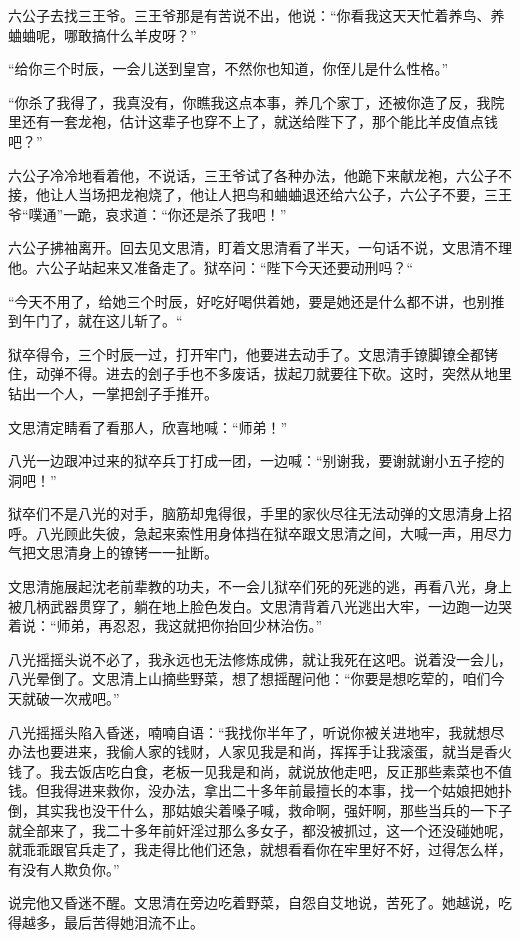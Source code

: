 六公子去找三王爷。三王爷那是有苦说不出，他说：“你看我这天天忙着养鸟、养蛐蛐呢，哪敢搞什么羊皮呀？”

“给你三个时辰，一会儿送到皇宫，不然你也知道，你侄儿是什么性格。”

“你杀了我得了，我真没有，你瞧我这点本事，养几个家丁，还被你造了反，我院里还有一套龙袍，估计这辈子也穿不上了，就送给陛下了，那个能比羊皮值点钱吧？”

六公子冷冷地看着他，不说话，三王爷试了各种办法，他跪下来献龙袍，六公子不接，他让人当场把龙袍烧了，他让人把鸟和蛐蛐退还给六公子，六公子不要，三王爷“噗通”一跪，哀求道：“你还是杀了我吧！”

六公子拂袖离开。回去见文思清，盯着文思清看了半天，一句话不说，文思清不理他。六公子站起来又准备走了。狱卒问：“陛下今天还要动刑吗？“

“今天不用了，给她三个时辰，好吃好喝供着她，要是她还是什么都不讲，也别推到午门了，就在这儿斩了。“

狱卒得令，三个时辰一过，打开牢门，他要进去动手了。文思清手镣脚镣全都铐住，动弹不得。进去的刽子手也不多废话，拔起刀就要往下砍。这时，突然从地里钻出一个人，一掌把刽子手推开。

文思清定睛看了看那人，欣喜地喊：“师弟！”

八光一边跟冲过来的狱卒兵丁打成一团，一边喊：“别谢我，要谢就谢小五子挖的洞吧！”

狱卒们不是八光的对手，脑筋却鬼得很，手里的家伙尽往无法动弹的文思清身上招呼。八光顾此失彼，急起来索性用身体挡在狱卒跟文思清之间，大喊一声，用尽力气把文思清身上的镣铐一一扯断。

文思清施展起沈老前辈教的功夫，不一会儿狱卒们死的死逃的逃，再看八光，身上被几柄武器贯穿了，躺在地上脸色发白。文思清背着八光逃出大牢，一边跑一边哭着说：“师弟，再忍忍，我这就把你抬回少林治伤。”

八光摇摇头说不必了，我永远也无法修炼成佛，就让我死在这吧。说着没一会儿，八光晕倒了。文思清上山摘些野菜，想了想摇醒问他：“你要是想吃荤的，咱们今天就破一次戒吧。”

八光摇摇头陷入昏迷，喃喃自语：“我找你半年了，听说你被关进地牢，我就想尽办法也要进来，我偷人家的钱财，人家见我是和尚，挥挥手让我滚蛋，就当是香火钱了。我去饭店吃白食，老板一见我是和尚，就说放他走吧，反正那些素菜也不值钱。但我得进来救你，没办法，拿出二十多年前最擅长的本事，找一个姑娘把她扑倒，其实我也没干什么，那姑娘尖着嗓子喊，救命啊，强奸啊，那些当兵的一下子就全部来了，我二十多年前奸淫过那么多女子，都没被抓过，这一个还没碰她呢，就乖乖跟官兵走了，我走得比他们还急，就想看看你在牢里好不好，过得怎么样，有没有人欺负你。”

说完他又昏迷不醒。文思清在旁边吃着野菜，自怨自艾地说，苦死了。她越说，吃得越多，最后苦得她泪流不止。

\newpage